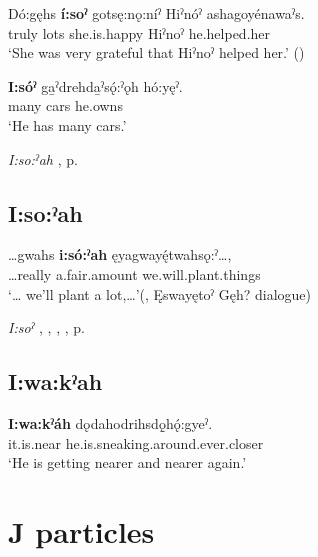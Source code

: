 \ea
\label{ex:ipar7}
\gll Dó:gęhs \textbf{í:soˀ} gotsę:nǫ:níˀ Hiˀnóˀ ashagoyénawaˀs.\\
truly lots she.is.happy Hiˀnoˀ he.helped.her\\
\glt ‘She was very grateful that Hiˀnoˀ helped her.’ (\cite{carrier_legends_2013})
\z

\ea
\label{ex:ipar8}
\gll \textbf{I:sóˀ} ga̱ˀdrehda̱ˀsǫ́:ˀǫh hó:yęˀ.\\
many cars he.owns\\
\glt ‘He has many cars.’
\z

\begin{CayugaRelated}
\item \textit{I:so:ˀah} , p. \pageref{p:[i:so:ˀah]}
\end{CayugaRelated}


\subsection*{\textbf{I:so:ˀah} } \label{p:[i:so:ˀah]}

\ea
\label{ex:ipar9}
\gll …gwahs \textbf{i:só:ˀah} ęyagwayę́twahsǫ:ˀ…,\\
…really a.fair.amount we.will.plant.things\\
\glt ‘… we’ll plant a lot,…’(\cite[420]{mithun_watewayestanih_1984}, Ęswayętoˀ Gęh? dialogue)
\z

\begin{CayugaRelated}
\item \textit{I:soˀ} , , , , p. \pageref{p:[i:soˀ]}
\end{CayugaRelated}


\subsection*{\textbf{I:wa:kˀah} } \label{p:[i:wa:kˀah]}

\ea
\label{ex:ipar10}
\gll \textbf{I:wa:kˀáh} dǫdahodrihsdǫ̱hǫ́:gyeˀ.\\
it.is.near he.is.sneaking.around.ever.closer\\
\glt ‘He is getting nearer and nearer again.’
\z


\section{J particles}

